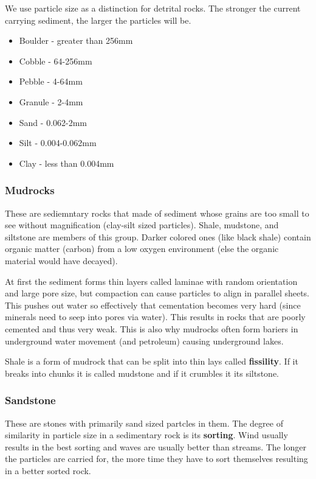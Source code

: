 \documentclass{article}
\begin{document}
We use particle size as a distinction for detrital rocks. The stronger the current carrying sediment, the larger the particles will be.

\begin{itemize}
    \item Boulder - greater than 256mm
    \item Cobble - 64-256mm
    \item Pebble - 4-64mm
    \item Granule - 2-4mm
    \item Sand - 0.062-2mm
    \item Silt - 0.004-0.062mm
    \item Clay - less than 0.004mm
\end{itemize}

\subsubsection*{Mudrocks} %
\label{sub:mudrocks}
These are sediemntary rocks that made of sediment whose grains are too small to see without magnification (clay-silt sized particles). Shale, mudstone, and siltstone are members of this group. Darker colored ones (like black shale) contain organic matter (carbon) from a low oxygen environment (else the organic material would have decayed).

At first the sediment forms thin layers called laminae with random orientation and large pore size, but compaction can cause particles to align in parallel sheets. This pushes out water so effectively that cementation becomes very hard (since minerals need to seep into pores via water). This results in rocks that are poorly cemented and thus very weak. This is also why mudrocks often form bariers in underground water movement (and petroleum) causing underground lakes.

Shale is a form of mudrock that can be split into thin lays called \textbf{fissility}. If it breaks into chunks it is called mudstone and if it crumbles it its siltstone.

\subsubsection*{Sandstone} %
\label{sub:sandstone}
These are stones with primarily sand sized partcles in them. The degree of similarity in particle size in a sedimentary rock is its \textbf{sorting}. Wind usually results in the best sorting and waves are usually better than streams. The longer the particles are carried for, the more time they have to sort themselves resulting in a better sorted rock.
\end{document}
